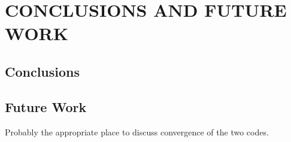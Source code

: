 
\chapter{CONCLUSIONS AND FUTURE WORK}

\section{Conclusions}

\section{Future Work}

Probably the appropriate place to discuss convergence
of the two codes.
